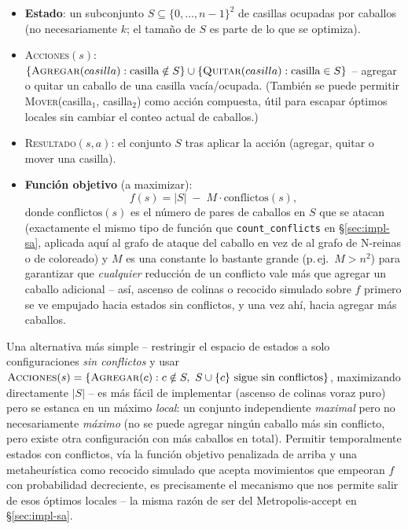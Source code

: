 \documentclass[11pt,onecolumn,letterpaper]{article}
\newcommand{\code}[1]{\texttt{#1}}
\begin{document}
\begin{itemize}[leftmargin=1.4em]
\item \textbf{Estado}: un subconjunto $S\subseteq\{0,\dots,n-1\}^2$ de casillas ocupadas
  por caballos (no necesariamente $k$; el tama\~no de $S$ es parte de lo que se optimiza).
\item \textsc{Acciones}$(s)$: $\{\textsc{Agregar}(casilla) : \text{casilla}\notin S\} \cup
  \{\textsc{Quitar}(casilla) : \text{casilla}\in S\}$ -- agregar o quitar un caballo de una
  casilla vac\'ia/ocupada. (Tambi\'en se puede permitir \textsc{Mover}(casilla$_1$,
  casilla$_2$) como acci\'on compuesta, \'util para escapar \'optimos locales sin cambiar el
  conteo actual de caballos.)
\item \textsc{Resultado}$(s,a)$: el conjunto $S$ tras aplicar la acci\'on (agregar, quitar
  o mover una casilla).
\item \textbf{Funci\'on objetivo} (a maximizar):
  $$f(s) = |S| \;-\; M\cdot\text{conflictos}(s),$$
  donde $\text{conflictos}(s)$ es el n\'umero de pares de caballos en $S$ que se atacan
  (exactamente el mismo tipo de funci\'on que \code{count\_conflicts} en
  \S\ref{sec:impl-sa}, aplicada aqu\'i al grafo de ataque del caballo en vez de al grafo de
  N-reinas o de coloreado) y $M$ es una constante lo bastante grande (p.\,ej.\ $M>n^2$)
  para garantizar que \emph{cualquier} reducci\'on de un conflicto vale m\'as que agregar
  un caballo adicional -- as\'i, ascenso de colinas o recocido simulado sobre $f$
  primero se ve empujado hacia estados sin conflictos, y una vez ah\'i, hacia agregar m\'as
  caballos.
\end{itemize}

Una alternativa m\'as simple -- restringir el espacio de estados a solo configuraciones
\emph{sin conflictos} y usar $\textsc{Acciones}(s)=\{\textsc{Agregar}(c) : c\notin S,\ S\cup\{c\}
\text{ sigue sin conflictos}\}$, maximizando directamente $|S|$ -- es m\'as f\'acil de
implementar (ascenso de colinas voraz puro) pero se estanca en un m\'aximo \emph{local}: un
conjunto independiente \emph{maximal} pero no necesariamente \emph{m\'aximo} (no se puede
agregar ning\'un caballo m\'as sin conflicto, pero existe otra configuraci\'on con m\'as
caballos en total). Permitir temporalmente estados con conflictos, v\'ia la funci\'on
objetivo penalizada de arriba y una metaheur\'istica como recocido simulado que acepta
movimientos que empeoran $f$ con probabilidad decreciente, es precisamente el mecanismo
que nos permite salir de esos \'optimos locales -- la misma raz\'on de ser del
Metropolis-accept en \S\ref{sec:impl-sa}.
\end{document}
